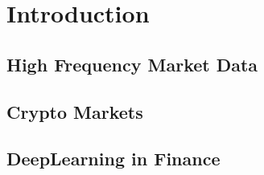 \section*{Introduction}

\subsection*{High Frequency Market Data}

\subsection*{Crypto Markets}

\subsection*{DeepLearning in Finance}


